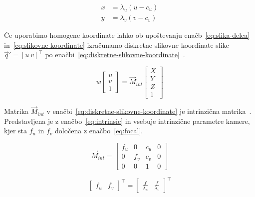 \begin{subequations}
\begin{align}
	x &= \lambda_u (u - c_u) \\
    y &= \lambda_v (v - c_v)
\end{align}
\label{eq:slikovne-koordinate}
\end{subequations}

Če uporabimo homogene koordinate lahko ob upoštevanju enačb~\eqref{eq:slika-delca} in~\eqref{eq:slikovne-koordinate} izračunamo diskretne slikovne koordinate slike $\vec{q}' = \left[ u~ v \right]^\top$ po enačbi~\eqref{eq:diskretne-slikovne-koordinate}~\cite{trucco1998introductory}.


\begin{equation}
	w \begin{bmatrix}
	u \\ v \\ 1
	\end{bmatrix} = \vec{M}_{int}
    \begin{bmatrix}
    X \\ Y \\ Z \\ 1
    \end{bmatrix}
    \label{eq:diskretne-slikovne-koordinate}
\end{equation}

Matrika $\vec{M}_{int}$ v enačbi~\eqref{eq:diskretne-slikovne-koordinate} je intrinzična matrika~\cite{trucco1998introductory}. Predstavljena je z enačbo~\eqref{eq:intrinsic} in vsebuje intrinzične parametre kamere, kjer sta $f_u$ in $f_v$ določena z enačbo~\eqref{eq:focal}.

\begin{equation}
\vec{M}_{int} = \begin{bmatrix}
	f_u & 0 & c_u & 0 \\
    0 & f_v & c_v & 0 \\
    0 & 0 & 1 & 0
\end{bmatrix}
\label{eq:intrinsic}
\end{equation}

\begin{equation}
\begin{bmatrix}
	f_u & f_v
\end{bmatrix}^\top = \begin{bmatrix}
	\frac{f}{\lambda_u} & \frac{f}{\lambda_v}
\end{bmatrix}^\top
\label{eq:focal}
\end{equation}


